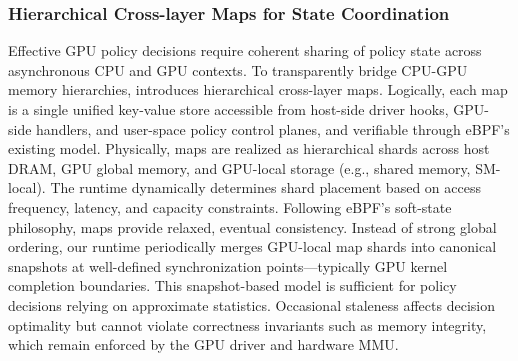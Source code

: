 \subsubsection{Hierarchical Cross-layer Maps for State Coordination}

Effective GPU policy decisions require coherent sharing of policy state across asynchronous CPU and GPU contexts. To transparently bridge CPU-GPU memory hierarchies, \sys introduces hierarchical cross-layer maps. Logically, each map is a single unified key-value store accessible from host-side driver hooks, GPU-side handlers, and user-space policy control planes, and verifiable through eBPF's existing model. Physically, maps are realized as hierarchical shards across host DRAM, GPU global memory, and GPU-local storage (e.g., shared memory, SM-local). The runtime dynamically determines shard placement based on access frequency, latency, and capacity constraints. Following eBPF's soft-state philosophy, \sys maps provide relaxed, eventual consistency. Instead of strong global ordering, our runtime periodically merges GPU-local map shards into canonical snapshots at well-defined synchronization points—typically GPU kernel completion boundaries. This snapshot-based model is sufficient for policy decisions relying on approximate statistics. Occasional staleness affects decision optimality but cannot violate correctness invariants such as memory integrity, which remain enforced by the GPU driver and hardware MMU.
